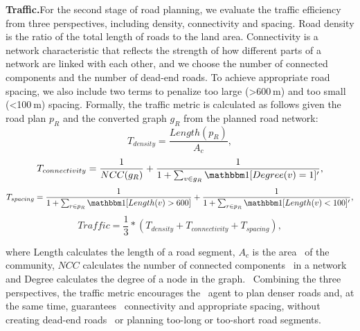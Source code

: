 \textbf{Traffic.}For the second stage of road planning, we evaluate the traffic 
efficiency from three perspectives, including density, connectivity
and spacing. Road density is the ratio of the total length of roads to 
the land area. Connectivity is a network characteristic that reflects the 
strength of how different parts of a network are linked with each other, 
and we choose the number of connected components and the number 
of dead-end roads. To achieve appropriate road spacing, we also include 
two terms to penalize too large (>600 m) and too small (<100 m) spacing. 
Formally, the traffic metric is calculated as follows given the road 
plan $p_R$ and the converted graph $g_R$ from the planned road network:
\begin{equation}
    T_{density}=\frac{Length(p_{R})}{A_c},\label{density}
\end{equation}
\begin{equation}
    T_{connectivity}=\frac{1}{NCC(g_R)}+\frac{1}{1+\sum_{v \in g_R}\mathbbm 1[Degree(v)=1]'},\label{connectivity}
\end{equation}
\begin{equation}
    T_{spacing}=\frac{1}{1+\sum_{r \in p_R}\mathbbm 1[Length(v)>600]}+\frac{1}{1+\sum_{r \in p_R}\mathbbm 1[Length(v)<100]'},\label{spacing}
\end{equation}
\begin{equation}
    Traffic=\frac{1}{3}*(T_{density}+T_{connectivity}+T_{spacing}),\label{traffic}
\end{equation}

where Length calculates the length of a road segment, $A_c$ is the area \
of the community, $NCC$ calculates the number of connected components \
in a network and Degree calculates the degree of a node in the graph. \
Combining the three perspectives, the traffic metric encourages the \
agent to plan denser roads and, at the same time, guarantees \
connectivity and appropriate spacing, without creating dead-end roads \
or planning too-long or too-short road segments.

